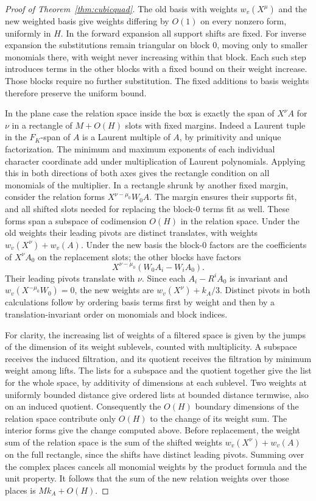 \documentclass[11pt,a4paper,reqno]{amsart}
\theoremstyle{definition}
\theoremstyle{remark}
\numberwithin{equation}{section}
\begin{document}
\begin{proof}[Proof of Theorem~\ref{thm:cubicquad}]
The old basis with weights \(w_v(X^\mu)\) and the
new weighted basis give weights differing by \(O(1)\)
on every nonzero form, uniformly in \(H\). In the
forward expansion all support shifts are fixed.
For inverse expansion the substitutions remain
triangular on block \(0\), moving only to smaller
monomials there, with weight never increasing
within that block. Each such step introduces
terms in the other blocks with a fixed bound on
their weight increase. Those blocks require no
further substitution. The fixed additions to
basis weights therefore preserve the uniform bound.

In the plane case the relation space inside the box
is exactly the span of \(X^\nu A\) for \(\nu\) in a
rectangle of \(M+O(H)\) slots with fixed margins.
Indeed a Laurent tuple in the \(F_K\)-span of \(A\)
is a Laurent multiple of \(A\), by primitivity and
unique factorization. The minimum and maximum
exponents of each individual character coordinate
add under multiplication of Laurent polynomials.
Applying this in both directions of both axes gives
the rectangle condition on all monomials of the
multiplier. In a rectangle shrunk by another fixed
margin, consider the relation forms
\(X^{\nu-\mu_0}W_0 A\). The margin ensures their
supports fit, and all shifted slots needed for
replacing the block-\(0\) terms fit as well. These
forms span a subspace of codimension \(O(H)\) in
the relation space. Under the old weights their
leading pivots are distinct translates, with
weights \(w_v(X^\nu)+w_v(A)\). Under the new basis
the block-\(0\) factors are the coefficients of
\(X^\nu A_0\) on the replacement slots; the other
blocks have factors
\[
              X^{\nu-\mu_0}(W_0 A_i-W_i A_0).
\]
Their leading pivots translate with \(\nu\).
Since each \(A_i-R^i A_0\) is invariant and
\(w_v(X^{-\mu_0}W_0)=0\), the new weights are
\(w_v(X^\nu)+k_A/3\).
Distinct pivots in both calculations follow by
ordering basis terms first by weight and then
by a translation-invariant order on monomials
and block indices.

For clarity, the increasing list of weights of
a filtered space is given by the jumps of the
dimension of its weight sublevels, counted with
multiplicity. A subspace receives the induced
filtration, and its quotient receives the
filtration by minimum weight among lifts.
The lists for a subspace and the quotient
together give the list for the whole space,
by additivity of dimensions at each sublevel.
Two weights at uniformly bounded distance
give ordered lists at bounded distance termwise,
also on an induced quotient. Consequently the
\(O(H)\) boundary dimensions of the relation space
contribute only \(O(H)\) to the change of
its weight sum. The interior forms give the
change computed above. Before replacement, the
weight sum of the relation space is the sum of
the shifted weights \(w_v(X^\nu)+w_v(A)\) on the
full rectangle, since the shifts have distinct
leading pivots. Summing over the complex places
cancels all monomial weights by the product
formula and the unit property. It follows that
the sum of the new relation weights over those
places is \(M k_A+O(H)\).


\end{proof}
\end{document}
